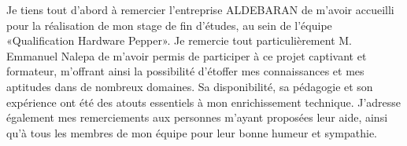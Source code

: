 Je tiens tout d'abord à remercier l'entreprise ALDEBARAN de m'avoir accueilli pour la réalisation de mon stage de fin d'études, au sein de l'équipe «Qualification Hardware Pepper».
Je remercie tout particulièrement M. Emmanuel Nalepa de m'avoir permis de participer à ce projet captivant et formateur, m’offrant ainsi la possibilité d'étoffer mes connaissances et mes aptitudes dans de nombreux domaines. Sa disponibilité, sa pédagogie et son expérience ont été des atouts essentiels à mon enrichissement technique.
J’adresse également mes remerciements aux personnes m'ayant proposées leur aide, ainsi qu'à tous les membres de mon équipe pour leur bonne humeur et sympathie.